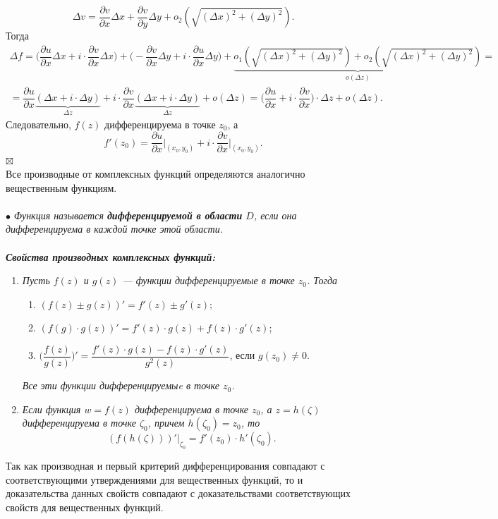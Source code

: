 \documentclass[a4paper, 12pt]{article}
\newenvironment{Proof} %
{\par\noindent{$\blacklozenge$}} %
{\hfill$\scriptstyle\boxtimes$}
\renewcommand{\d}{\partial}
\begin{document}
\begin{Proof}
	$$\Delta v = \dfrac{\d v}{\d x}\Delta x + \dfrac{\d v}{\d y}\Delta y + o_2(\sqrt{(\Delta x)^2 + (\Delta y)^2}).$$
	Тогда\begin{multline*}
		\Delta f = \Big(\dfrac{\d u}{\d x}\Delta x+ i\cdot \dfrac{\d v}{\d x}\Delta x\Big) + \Big(-\dfrac{\d v}{\d x}\Delta y + i\cdot \dfrac{\d u}{\d x}\Delta y\Big) + \underbrace{o_1(\sqrt{(\Delta x)^2 + (\Delta y)^2}) + o_2(\sqrt{(\Delta x)^2 + (\Delta y)^2})}_{o(\Delta z)}=\\=\dfrac{\d u}{\d x}\underbrace{(\Delta x + i\cdot \Delta y)}_{\Delta z} + i\cdot \dfrac{\d v}{\d x}\underbrace{(\Delta x + i\cdot \Delta y)}_{\Delta z} + o(\Delta z) = \Big(\dfrac{\d u}{\d x} + i\cdot \dfrac{\d v}{\d x}\Big)\cdot \Delta z + o(\Delta z).
	\end{multline*}
Следовательно, $f(z)$ дифференцируема в точке $z_0$, а $$f'(z_0) = \dfrac{\d u}{\d x}\Big |_{(x_0,y_0)} + i\cdot \dfrac{\d v}{\d x}\Big |_{(x_0,y_0)}.$$
\end{Proof}\\
Все производные от комплексных функций определяются аналогично вещественным функциям.\\\\
$\bullet$\textit{ Функция называется \textbf{дифференцируемой в области} $D$, если она дифференцируема в каждой точке этой области.}\\\\
\textbf{\textit{Свойства производных комплексных функций:}}
\begin{enumerate}
	\item \textit{Пусть $f(z)$ и $g(z)$ --- функции дифференцируемые в точке $z_0$. Тогда }\begin{enumerate}
		\item $(f(z)\pm g(z))' = f'(z) \pm g'(z)$;
		\item $(f(g)\cdot g(z))' = f'(z)\cdot g(z) + f(z)\cdot g'(z)$;
		\item $\Big(\dfrac{f(z)}{g(z)}\Big)' = \dfrac{f'(z)\cdot g(z) - f(z)\cdot g'(z)}{g^2(z)}$, если $g(z_0) \ne 0$.
	\end{enumerate}
	\textit{Все эти функции дифференцируемыe в точке $z_0$.}
	\item \textit{Если функция $w = f(z)$ дифференцируема в точке $z_0$, а $z = h(\zeta)$ дифференцируема в точке $\zeta_0$, причем $h(\zeta_0) = z_0$, то }$$(f(h(\zeta)))'\Big|_{\zeta_0} = f'(z_0)\cdot h'(\zeta_0).$$
\end{enumerate}
Так как производная и первый критерий дифференцирования совпадают с соответствующими утверждениями для вещественных функций, то и доказательства данных свойств совпадают с доказательствами соответствующих свойств для вещественных функций.
\end{document}
